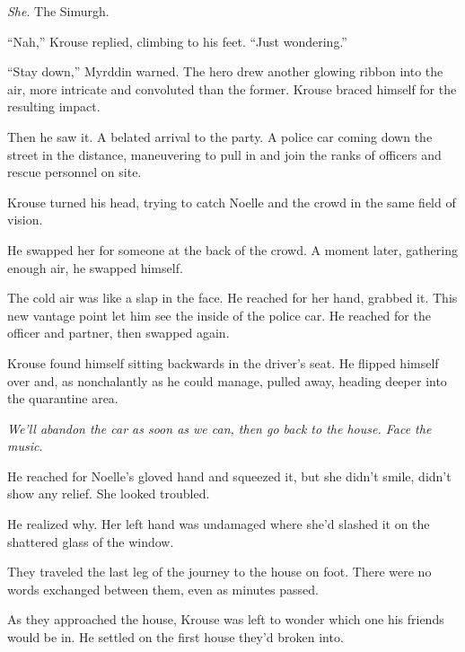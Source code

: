 \emph{She}.  The Simurgh.



``Nah,'' Krouse replied, climbing to his feet.  ``Just wondering.''



``Stay down,'' Myrddin warned.  The hero drew another glowing ribbon into the air, more intricate and convoluted than the former.  Krouse braced himself for the resulting impact.



Then he saw it.  A belated arrival to the party.  A police car coming down the street in the distance, maneuvering to pull in and join the ranks of officers and rescue personnel on site.



Krouse turned his head, trying to catch Noelle and the crowd in the same field of vision.



He swapped her for someone at the back of the crowd.  A moment later, gathering enough air, he swapped himself.



The cold air was like a slap in the face.  He reached for her hand, grabbed it.  This new vantage point let him see the inside of the police car.  He reached for the officer and partner, then swapped again.



Krouse found himself sitting backwards in the driver's seat.  He flipped himself over and, as nonchalantly as he could manage, pulled away, heading deeper into the quarantine area.



\emph{We'll abandon the car as soon as we can, then go back to the house.  Face the music}.



He reached for Noelle's gloved hand and squeezed it, but she didn't smile, didn't show any relief.  She looked troubled.



He realized why.  Her left hand was undamaged where she'd slashed it on the shattered glass of the window.



\blacksquare



They traveled the last leg of the journey to the house on foot.  There were no words exchanged between them, even as minutes passed.



As they approached the house, Krouse was left to wonder which one his friends would be in.  He settled on the first house they'd broken into.



